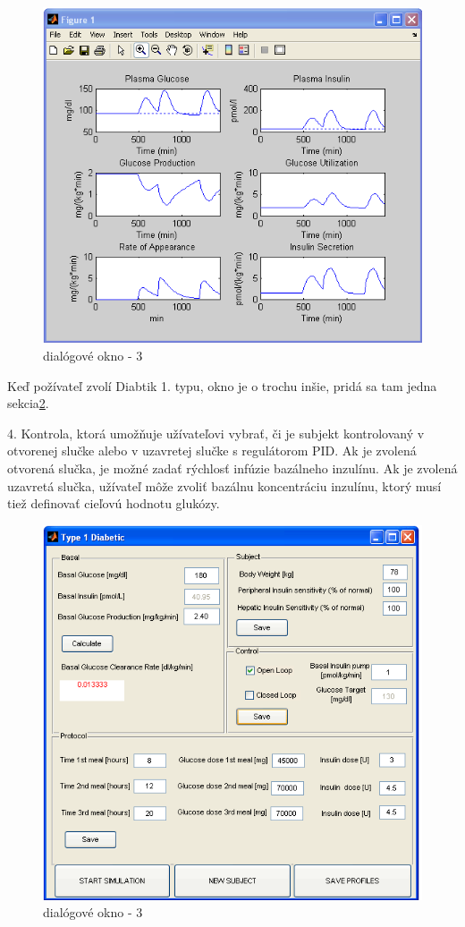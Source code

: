 \begin{figure}[H]
\centering
\includegraphics[scale=0.8]{ob-3.PNG}
\caption{dialógové okno - 3 \cite{2007}}
\label{okno3}
\end{figure}

Keď požívateľ zvolí  Diabtik 1. typu, okno je o trochu inšie, pridá sa tam jedna sekcia\ref{okno4}.

4. Kontrola, ktorá umožňuje užívateľovi vybrať, či je subjekt kontrolovaný v otvorenej slučke alebo v uzavretej slučke s regulátorom PID. Ak je zvolená otvorená slučka, je možné zadať rýchlosť infúzie bazálneho inzulínu. Ak je zvolená uzavretá slučka, užívateľ môže zvoliť bazálnu koncentráciu inzulínu, ktorý musí tiež definovať cieľovú hodnotu glukózy. \cite{2007}

\begin{figure}[H]
\centering
\includegraphics[scale=0.8]{ob-4.PNG}
\caption{dialógové okno - 3 \cite{2007}}
\label{okno4}
\end{figure}

